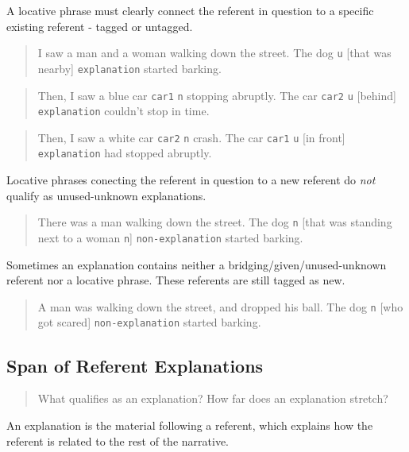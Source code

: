 \documentclass[
]{book}
\begin{document}
A locative phrase must clearly connect the referent in question
to a specific existing referent - tagged or untagged.

\begin{quote}
I saw a man and a woman walking down the street.
The dog \texttt{u} {[}that was nearby{]} \texttt{explanation} started barking.
\end{quote}

\begin{quote}
Then, I saw a blue car \texttt{car1} \texttt{n} stopping abruptly.
The car \texttt{car2} \texttt{u} {[}behind{]} \texttt{explanation} couldn't stop in time.
\end{quote}

\begin{quote}
Then, I saw a white car \texttt{car2} \texttt{n} crash.
The car \texttt{car1} \texttt{u} {[}in front{]} \texttt{explanation} had stopped abruptly.
\end{quote}

Locative phrases conecting the referent in question to a new referent
do \emph{not} qualify as unused-unknown explanations.

\begin{quote}
There was a man walking down the street.
The dog \texttt{n}
{[}that was standing next to a woman \texttt{n}{]} \texttt{non-explanation} started barking.
\end{quote}

Sometimes an explanation contains neither
a bridging/given/unused-unknown referent nor a locative phrase.
These referents are still tagged as new.

\begin{quote}
A man was walking down the street, and dropped his ball.
The dog \texttt{n} {[}who got scared{]} \texttt{non-explanation} started barking.
\end{quote}

\hypertarget{span-of-referent-explanations}{%
\subsection{Span of Referent Explanations}\label{span-of-referent-explanations}}

\begin{quote}
What qualifies as an explanation?
How far does an explanation stretch?
\end{quote}

An explanation is the material following a referent,
which explains how the referent is related to the rest of the narrative.
\end{document}
